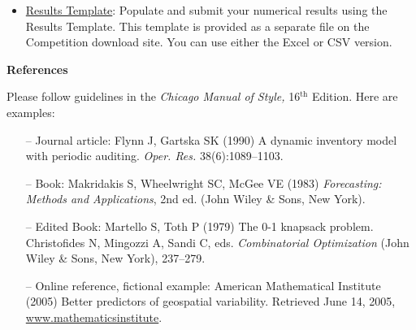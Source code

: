 \documentclass[11pt]{article}
\begin{document}
\begin{itemize}
\item \underline {Results Template}: Populate and submit your numerical results using the Results Template. This template is provided as a separate file on the Competition download site. You can use either the Excel or CSV version.
\end{itemize}

\textbf{References}

\bgroup
\parskip0pt

Please follow guidelines in the \textit{Chicago Manual of Style,} 16$^{\text{th}}$ Edition. Here are examples: 

\begin{itemize}
\item[--] Journal article: Flynn J, Gartska SK (1990) A dynamic inventory model with periodic auditing. \textit{Oper. Res.} 38(6):1089--1103. 
\item[--] Book: Makridakis S, Wheelwright SC, McGee VE (1983) \textit{Forecasting: Methods and Applications}, 2nd ed. (John Wiley {\&} Sons, New York). 
\item[--] Edited Book: Martello S, Toth P (1979) The 0-1 knapsack problem. Christofides N, Mingozzi A, Sandi C, eds. \textit{Combinatorial Optimization} (John Wiley {\&} Sons, New York), 237--279.
\item[--] Online reference, fictional example: American Mathematical Institute (2005) Better predictors of geospatial variability. Retrieved June 14, 2005, \underline {www.mathematicsinstitute}.

\end{itemize}

\egroup
\end{document}
